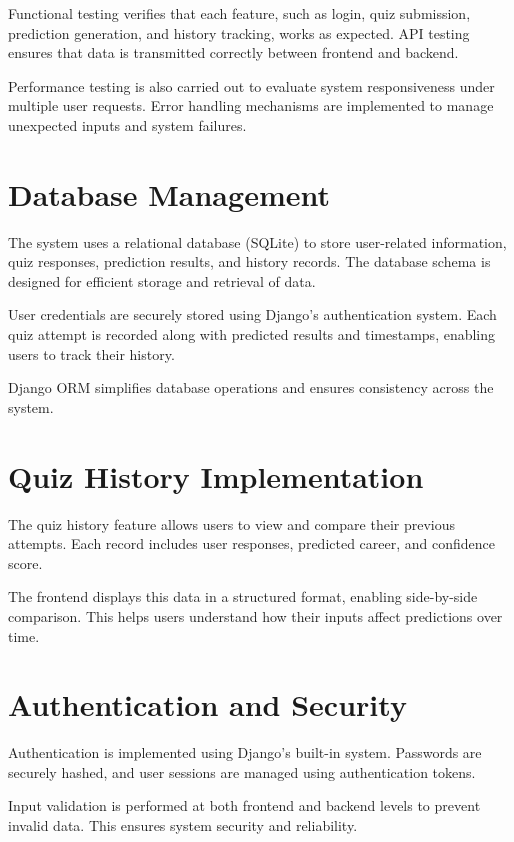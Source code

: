 \documentclass[12pt,a4paper]{report}
\begin{document}
{Functional testing verifies that each feature, such as login, quiz submission, prediction generation, and history tracking, works as expected. API testing ensures that data is transmitted correctly between frontend and backend.

Performance testing is also carried out to evaluate system responsiveness under multiple user requests. Error handling mechanisms are implemented to manage unexpected inputs and system failures.

\section{Database Management}

The system uses a relational database (SQLite) to store user-related information, quiz responses, prediction results, and history records. The database schema is designed for efficient storage and retrieval of data.

User credentials are securely stored using Django's authentication system. Each quiz attempt is recorded along with predicted results and timestamps, enabling users to track their history.

Django ORM simplifies database operations and ensures consistency across the system.

\section{Quiz History Implementation}

The quiz history feature allows users to view and compare their previous attempts. Each record includes user responses, predicted career, and confidence score.

The frontend displays this data in a structured format, enabling side-by-side comparison. This helps users understand how their inputs affect predictions over time.

\section{Authentication and Security}

Authentication is implemented using Django’s built-in system. Passwords are securely hashed, and user sessions are managed using authentication tokens.

Input validation is performed at both frontend and backend levels to prevent invalid data. This ensures system security and reliability.

}
\end{document}
